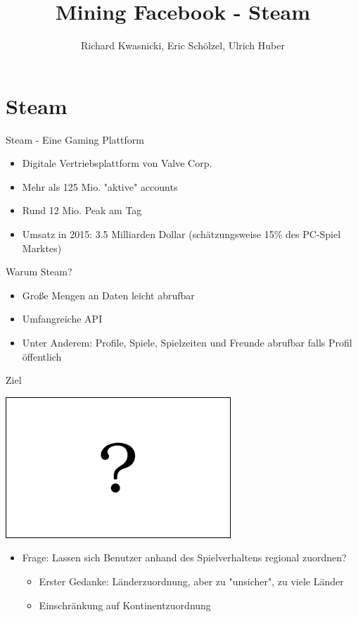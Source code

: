 \documentclass[12pt]{beamer}
\author{Richard Kwasnicki, Eric Schölzel, Ulrich Huber}
\title{Mining Facebook - Steam}
\begin{document}
\begin{frame}
\titlepage
\end{frame}


\section{Steam}
\begin{frame}{Steam - Eine Gaming Plattform}
	\begin{itemize}
		\item Digitale Vertriebsplattform von Valve Corp.
		\item Mehr als 125 Mio. "aktive" accounts
		\item Rund 12 Mio. Peak am Tag
		\item Umsatz in 2015:  3.5 Milliarden Dollar (schätzungsweise 15\% des PC-Spiel Marktes)
	\end{itemize}
\end{frame}

\begin{frame}{Warum Steam?}
	\begin{itemize}
		\item Große Mengen an Daten leicht abrufbar
		\item Umfangreiche API
		\item Unter Anderem: Profile, Spiele, Spielzeiten und Freunde abrufbar falls Profil öffentlich 
	\end{itemize}
\end{frame}



\begin{frame}{Ziel}
	\centerline{\includegraphics[scale=0.3]{img/question_flag.png}}
	\begin{itemize}
		\item Frage: Lassen sich Benutzer anhand des Spielverhaltens regional zuordnen?
			\begin{itemize}
			\item Erster Gedanke: Länderzuordnung, aber zu "unsicher", zu viele Länder
			\item Einschränkung auf Kontinentzuordnung
			\end{itemize}
	\end{itemize}
\end{frame}
\end{document}
